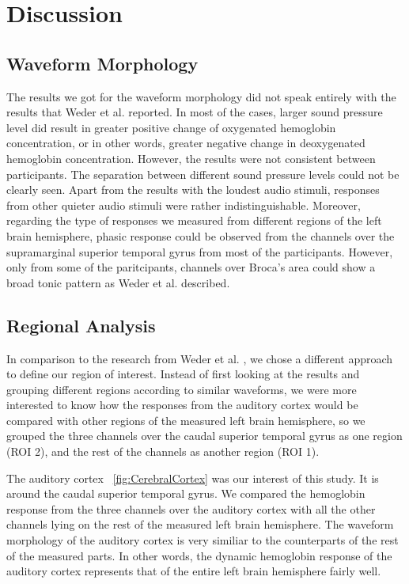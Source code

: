 \chapter{Discussion}

\section{Waveform Morphology}
The results we got for the waveform morphology did not speak entirely with the results that Weder et al. \citeyearpar{Weder2018} reported. In most of the cases, larger sound pressure level did result in greater positive change of oxygenated hemoglobin concentration, or in other words, greater negative change in deoxygenated hemoglobin concentration. However, the results were not consistent between participants. The separation between different sound pressure levels could not be clearly seen. Apart from the results with the loudest audio stimuli, responses from other quieter audio stimuli were rather indistinguishable. Moreover, regarding the type of responses we measured from different regions of the left brain hemisphere, phasic response could be observed from the channels over the supramarginal superior temporal gyrus from most of the participants. However, only from some of the paritcipants, channels over Broca's area could show a broad tonic pattern as Weder et al. \citeyearpar{Weder2018} described.

\section {Regional Analysis}
In comparison to the research from Weder et al. \citeyearpar{Weder2018}, we chose a different approach to define our region of interest. Instead of first looking at the results and grouping different regions according to similar waveforms, we were more interested to know how the responses from the auditory cortex would be compared with other regions of the measured left brain hemisphere, so we grouped the three channels over the caudal superior temporal gyrus as one region (ROI 2), and the rest of the channels as another region (ROI 1).

The auditory cortex ~\ref{fig:CerebralCortex} was our interest of this study. It is around the caudal superior temporal gyrus. We compared the hemoglobin response from the three channels over the auditory cortex with all the other channels lying on the rest of the measured left brain hemisphere. The waveform morphology of the auditory cortex is very similiar to the counterparts of the rest of the measured parts. In other words, the dynamic hemoglobin response of the auditory cortex represents that of the entire left brain hemisphere fairly well.

